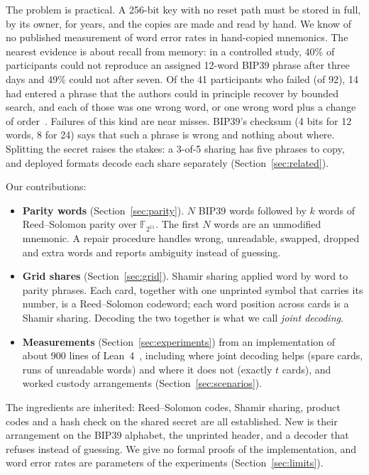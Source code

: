 \documentclass[numeric]{anvil-paper}
\newcommand{\F}{\mathbb{F}}
\begin{document}
The problem is practical. A 256-bit key with no reset path must be stored in
full, by its owner, for years, and the copies are made and read by hand. We
know of no published measurement of word error rates in hand-copied mnemonics.
The nearest evidence is about recall from memory: in a controlled study, 40\%
of participants could not reproduce an assigned 12-word BIP39 phrase after
three days and 49\% could not after seven. Of the 41 participants who failed (of 92),
14 had entered a phrase that the authors could in principle recover by bounded
search, and each of those was one wrong word, or one wrong word plus a change
of order~\citep{ambati2026notall}. Failures of
this kind are near misses. BIP39's checksum (4 bits for 12 words, 8 for 24)
says that such a phrase is wrong and nothing about where. Splitting the secret
raises the stakes: a 3-of-5 sharing has five phrases to copy, and deployed
formats decode each share separately (Section~\ref{sec:related}).

Our contributions:
\begin{itemize}
\item \textbf{Parity words} (Section~\ref{sec:parity}). $N$ BIP39 words
  followed by $k$ words of Reed--Solomon parity over $\F_{2^{11}}$. The first
  $N$ words are an unmodified mnemonic. A repair procedure handles wrong,
  unreadable, swapped, dropped and extra words and reports ambiguity instead
  of guessing.
\item \textbf{Grid shares} (Section~\ref{sec:grid}). Shamir sharing applied word
  by word to parity phrases. Each card, together with one unprinted symbol
  that carries its number, is a Reed--Solomon codeword; each word position
  across cards is a Shamir sharing. Decoding the two together is what we call
  \emph{joint decoding}.
\item \textbf{Measurements} (Section~\ref{sec:experiments}) from an
  implementation of about 900 lines of Lean~4~\citep{moura2021lean}, including
  where joint decoding helps (spare cards, runs of unreadable words) and where
  it does not (exactly $t$ cards), and worked custody arrangements
  (Section~\ref{sec:scenarios}).
\end{itemize}
The ingredients are inherited: Reed--Solomon codes, Shamir sharing, product
codes and a hash check on the shared secret are all established. New is their
arrangement on the BIP39 alphabet, the unprinted header, and a decoder that
refuses instead of guessing. We give no formal proofs of the implementation,
and word error rates are parameters of the experiments
(Section~\ref{sec:limits}).
\end{document}
